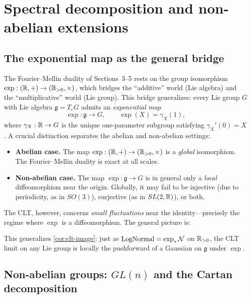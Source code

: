 \section{Spectral decomposition and non-abelian extensions}\label{sec:spectral}

\subsection*{The exponential map as the general bridge}

The Fourier--Mellin duality of Sections~3--5 rests on the group isomorphism $\exp : (\mathbb{R}, +) \to (\mathbb{R}_{>0}, \times)$, which bridges the ``additive'' world (Lie algebra) and the ``multiplicative'' world (Lie group). This bridge generalizes: every Lie group $G$ with Lie algebra $\mathfrak{g} = T_e G$ admits an \emph{exponential map}
\[
\exp : \mathfrak{g} \to G, \qquad \exp(X) = \gamma_X(1),
\]
where $\gamma_X : \mathbb{R} \to G$ is the unique one-parameter subgroup satisfying $\gamma_X'(0) = X$ \cite[Chapter~3]{Hall}. A crucial distinction separates the abelian and non-abelian settings:
\begin{itemize}
\item \textbf{Abelian case.} The map $\exp : (\mathbb{R}, +) \to (\mathbb{R}_{>0}, \times)$ is a \emph{global} isomorphism. The Fourier--Mellin duality is exact at all scales.
\item \textbf{Non-abelian case.} The map $\exp : \mathfrak{g} \to G$ is in general only a \emph{local} diffeomorphism near the origin. Globally, it may fail to be injective (due to periodicity, as in $SO(3)$), surjective (as in $SL(2, \mathbb{R})$), or both.
\end{itemize}
The CLT, however, concerns \emph{small fluctuations} near the identity---precisely the regime where $\exp$ is a diffeomorphism. The general picture is:

\begin{center}
\end{center}

\noindent This generalizes \cref{cor:clt-image}: just as $\operatorname{LogNormal} = \exp_*\mathcal{N}$ on $\mathbb{R}_{>0}$, the CLT limit on any Lie group is locally the pushforward of a Gaussian on $\mathfrak{g}$ under $\exp$.

\subsection*{Non-abelian groups: $GL(n)$ and the Cartan decomposition}

